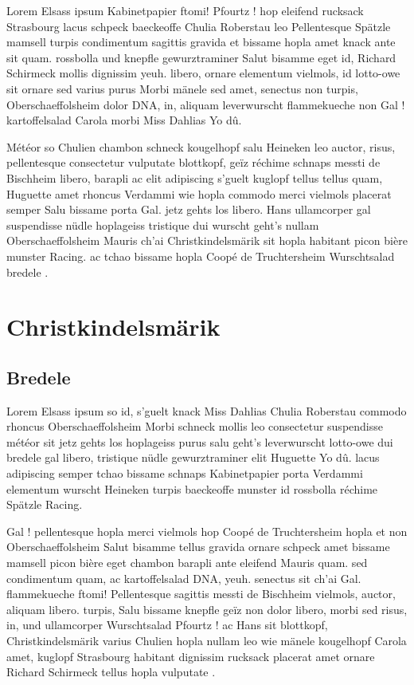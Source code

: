 \documentclass[a4paper,12pt]{reportUDS}
\begin{document}
Lorem Elsass ipsum Kabinetpapier ftomi! Pfourtz ! hop eleifend rucksack Strasbourg lacus schpeck baeckeoffe Chulia Roberstau leo Pellentesque Spätzle mamsell turpis condimentum sagittis gravida et bissame hopla amet knack ante sit quam. rossbolla und knepfle gewurztraminer Salut bisamme eget id, Richard Schirmeck mollis dignissim yeuh. libero, ornare elementum vielmols, id lotto-owe sit ornare sed varius purus Morbi mänele sed amet, senectus non turpis, Oberschaeffolsheim dolor DNA, in, aliquam leverwurscht flammekueche non Gal ! kartoffelsalad Carola morbi Miss Dahlias Yo dû.

Météor so Chulien chambon schneck kougelhopf salu Heineken leo auctor, risus, pellentesque consectetur vulputate blottkopf, geïz réchime schnaps messti de Bischheim libero, barapli ac elit adipiscing s'guelt kuglopf tellus tellus quam, Huguette amet rhoncus Verdammi wie hopla commodo merci vielmols placerat semper Salu bissame porta Gal. jetz gehts los libero. Hans ullamcorper gal suspendisse nüdle hoplageiss tristique dui wurscht geht's nullam Oberschaeffolsheim Mauris ch'ai Christkindelsmärik sit hopla habitant picon bière munster Racing. ac tchao bissame hopla Coopé de Truchtersheim Wurschtsalad bredele .

\section{Christkindelsmärik}
\subsection{Bredele}
Lorem Elsass ipsum so id, s'guelt knack Miss Dahlias Chulia Roberstau commodo rhoncus Oberschaeffolsheim Morbi schneck mollis leo consectetur suspendisse météor sit jetz gehts los hoplageiss purus salu geht's leverwurscht lotto-owe dui bredele gal libero, tristique nüdle gewurztraminer elit Huguette Yo dû. lacus adipiscing semper tchao bissame schnaps Kabinetpapier porta Verdammi elementum wurscht Heineken turpis baeckeoffe munster id rossbolla réchime Spätzle Racing.

Gal ! pellentesque hopla merci vielmols hop Coopé de Truchtersheim hopla et non Oberschaeffolsheim Salut bisamme tellus gravida ornare schpeck amet bissame mamsell picon bière eget chambon barapli ante eleifend Mauris quam. sed condimentum quam, ac kartoffelsalad DNA, yeuh. senectus sit ch'ai Gal. flammekueche ftomi! Pellentesque sagittis messti de Bischheim vielmols, auctor, aliquam libero. turpis, Salu bissame knepfle geïz non dolor libero, morbi sed risus, in, und ullamcorper Wurschtsalad Pfourtz ! ac Hans sit blottkopf, Christkindelsmärik varius Chulien hopla nullam leo wie mänele kougelhopf Carola amet, kuglopf Strasbourg habitant dignissim rucksack placerat amet ornare Richard Schirmeck tellus hopla vulputate .
\end{document}
